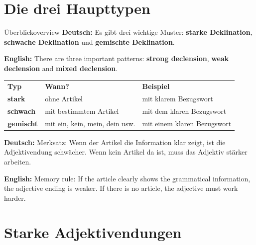 \documentclass[a4paper,11pt]{article}
\newcommand{\GermanText}[1]{\textbf{Deutsch: }#1\par}
\newcommand{\EnglishText}[1]{{\small\color{SoftGray}\textbf{English: }#1\par}}
\begin{document}
\section{Die drei Haupttypen}

\begin{grammarentry}{Überblick}{overview}
\GermanText{Es gibt drei wichtige Muster: \textbf{starke Deklination}, \textbf{schwache Deklination} und \textbf{gemischte Deklination}.}
\EnglishText{There are three important patterns: \textbf{strong declension}, \textbf{weak declension} and \textbf{mixed declension}.}

\begin{center}
\begin{tabular}{>{\bfseries}p{3.5cm}p{5cm}p{5cm}}
\rowcolor{HeaderBlueDark}
\color{white}\textbf{Typ} & \color{white}\textbf{Wann?} & \color{white}\textbf{Beispiel} \\
stark & ohne Artikel & mit klarem Bezugswort \\
schwach & mit bestimmtem Artikel & mit dem klaren Bezugswort \\
gemischt & mit ein, kein, mein, dein usw. & mit einem klaren Bezugswort \\
\end{tabular}
\end{center}

\GermanText{Merksatz: Wenn der Artikel die Information klar zeigt, ist die Adjektivendung schwächer. Wenn kein Artikel da ist, muss das Adjektiv stärker arbeiten.}
\EnglishText{Memory rule: If the article clearly shows the grammatical information, the adjective ending is weaker. If there is no article, the adjective must work harder.}
\end{grammarentry}

\section{Starke Adjektivendungen}
\end{document}
